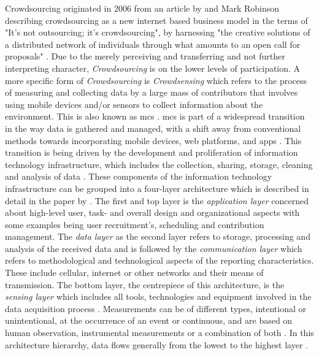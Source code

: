 Crowdsourcing originated in 2006 from an article by \autocite{howeRiseCrowdsourcing} and Mark Robinson describing crowdsourcing as a new internet based business model in the terms of "It's not outsourcing; it's crowdsourcing", by harnessing "the creative solutions of a distributed network of individuals through what amounts to an open call for proposals" \autocite[76]{brabhamCrowdsourcingModelProblem2008}. Due to the merely perceiving and transferring and not further interpreting character, \textit{Crowdsourcing} is on the lower levels of participation. A more specific form of \textit{Crowdsourcing} is \textit{Crowdsensing} which refers to the process of measuring and collecting data by a large mass of contributors that involves using mobile devices and/or sensors to collect information about the environment. This is also known as \acrfull{mcs} \autocite{guoParticipatorySensingMobile2014, liuSurveyMobileCrowdsensing2018}.\newline
\acrshort{mcs} is part of a widespread transition in the way data is gathered and managed, with a shift away from conventional methods towards incorporating mobile devices, web platforms, and apps \autocite{capponiSurveyMobileCrowdsensing2019, sanllorentecapdevilaSuccessFactorsCitizen2020}. This transition is being driven by the development and proliferation of information technology infrastructure, which includes the collection, sharing, storage, cleaning and analysis of data \autocite{fraislCitizenScienceEnvironmental2022}. These components of the information technology infrastructure can be grouped into a four-layer architecture which is described in detail in the paper by \autocite{capponiSurveyMobileCrowdsensing2019}.
The first and top layer is the \textit{application layer} concerned about high-level user, task- and overall design and organizational aspects with some examples being user recruitment's, scheduling and contribution management. The \textit{data layer} as the second layer refers to storage, processing and analysis of the received data and is followed by the \textit{communication layer} which refers to methodological and technological aspects of the reporting characteristics. These include cellular, internet or other networks and their means of transmission. The bottom layer, the centrepiece of this architecture, is the \textit{sensing layer} which includes all tools, technologies and equipment involved in the data acquisition process \autocite{capponiSurveyMobileCrowdsensing2019}. Measurements can be of different types, intentional or unintentional, at the occurrence of an event or continuous, and are based on human observation, instrumental measurements or a combination of both \autocite{zhengCrowdsourcingMethodsData2018}. In this architecture hierarchy, data flows generally from the lowest to the highest layer \autocite{aceves-buenoCitizenScienceApproach2015,capponiSurveyMobileCrowdsensing2019,zhengCrowdsourcingMethodsData2018}.\newline
